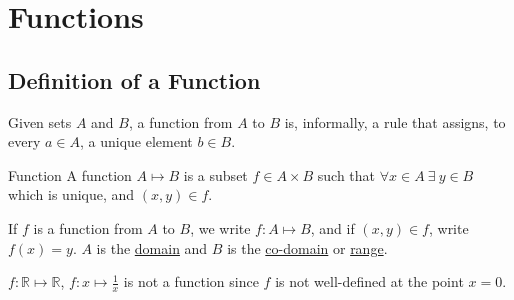 \documentclass[../Main.tex]{subfiles}
\begin{document}
\section{Functions}
\subsection{Definition of a Function}
Given sets $A$ and $B$, a function from $A$ to $B$ is, informally, a rule that assigns, to every $a \in A$, a unique element $b \in B$.
\begin{definition}{Function}
    A function $A \mapsto B$ is a subset $f \in A \times B$ such that $\forall x \in A~\exists~y \in B$ which is unique, and $(x, y) \in f$.
\end{definition}
If $f$ is a function from $A$ to $B$, we write $f : A \mapsto B$, and if $(x, y) \in f$, write $f(x) = y$. $A$ is the \underline{domain} and $B$ is the \underline{co-domain} or \underline{range}.
\begin{example}
    $f : \mathbb{R} \mapsto \mathbb{R}$, $f : x \mapsto \frac{1}{x}$ is not a function since $f$ is not well-defined at the point $x=0$.
\end{example}
\end{document}
